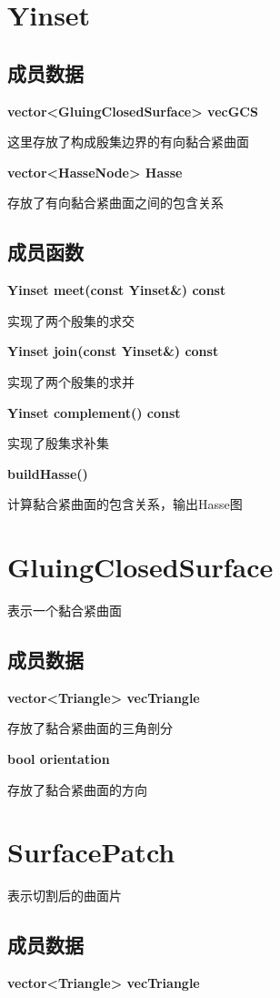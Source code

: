 \documentclass[UTF8]{ctexart}
\begin{document}
	\section{Yinset}
	\subsection{成员数据}
	\textbf{vector<GluingClosedSurface> vecGCS}
	
	这里存放了构成殷集边界的有向黏合紧曲面
	
	\textbf{vector<HasseNode> Hasse}
	
	存放了有向黏合紧曲面之间的包含关系
	\subsection{成员函数}
	\textbf{Yinset meet(const Yinset\&) const}
	
	实现了两个殷集的求交
	
	\textbf{Yinset join(const Yinset\&) const}
	
	实现了两个殷集的求并
	
	\textbf{Yinset complement() const}
	
	实现了殷集求补集
	
	\textbf{buildHasse()}
	
	计算黏合紧曲面的包含关系，输出Hasse图
	
	
	\section{GluingClosedSurface}
	表示一个黏合紧曲面
	
	\subsection{成员数据}
	\textbf{vector<Triangle> vecTriangle}
	
	存放了黏合紧曲面的三角剖分
	
	\textbf{bool orientation}
	
	存放了黏合紧曲面的方向
	
	\section{SurfacePatch}
	表示切割后的曲面片
	
	\subsection{成员数据}
	\textbf{vector<Triangle> vecTriangle}
	
\end{document}
